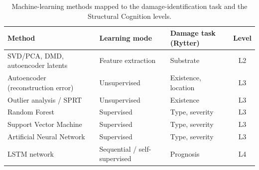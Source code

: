 \begin{table}[htbp]
\centering
\caption{Machine-learning methods mapped to the damage-identification task and the Structural Cognition levels.}
\label{tab:mlmethods}
\begin{tabularx}{\linewidth}{@{}X l l c@{}}
\toprule
\textbf{Method} & \textbf{Learning mode} & \textbf{Damage task (Rytter)} & \textbf{Level} \\
\midrule
SVD/PCA, DMD, autoencoder latents & Feature extraction     & Substrate            & L2 \\
Autoencoder (reconstruction error) & Unsupervised          & Existence, location  & L3 \\
Outlier analysis / SPRT      & Unsupervised                & Existence            & L3 \\
Random Forest                & Supervised                  & Type, severity       & L3 \\
Support Vector Machine       & Supervised                  & Type, severity       & L3 \\
Artificial Neural Network    & Supervised                  & Type, severity       & L3 \\
LSTM network                 & Sequential / self-supervised & Prognosis           & L4 \\
\bottomrule
\end{tabularx}
\end{table}
